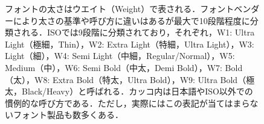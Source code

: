 \begin{figure}[b]
\begin{itembox}[l]{}
\small\sffamily\mgfamily
フォントの太さはウエイト（Weight）で表される．フォントベンダーにより太さの基準や呼び方に違いはあるが最大で10段階程度に分類される．ISOでは9段階に分類されており，それぞれ，W1: Ultra Light（極細，Thin），W2: Extra Light（特細，Ultra Light），W3: Light（細），W4: Semi Light（中細，Regular/Normal），W5: Medium（中），W6: Semi Bold（中太，Demi Bold），W7: Bold（太），W8: Extra Bold（特太，Ultra Bold），W9: Ultra Bold（極太，Black/Heavy）と呼ばれる．カッコ内は日本語やISO以外での慣例的な呼び方である．ただし，実際にはこの表記が当てはまらないフォント製品も数多くある．
\end{itembox}
\end{figure}
